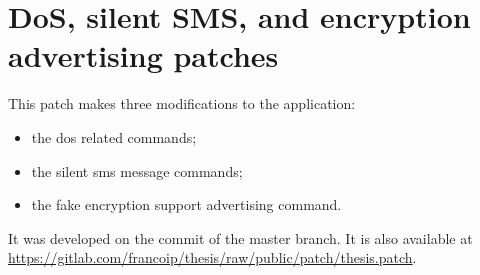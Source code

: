 \chapter{DoS, silent SMS, and encryption advertising patches}
\label{app:patches}

This patch makes three modifications to the  application:

\begin{itemize}[topsep=-1em,parsep=0em,itemsep=0.5em]
  \item the \gls{dos} related commands;
  \item the silent \gls{sms} message commands;
  \item the fake encryption support advertising command.
\end{itemize}

It was developed on the 
commit of the master branch. It is also available at
\url{https://gitlab.com/francoip/thesis/raw/public/patch/thesis.patch}.


